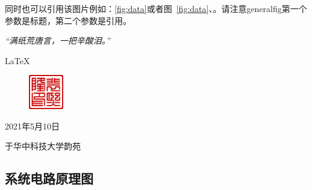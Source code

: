 \documentclass[supercite]{HustGraduPaper}
\begin{document}
同时也可以引用该图片例如：\autoref{fig:data}或者图~\ref{fig:data}、。请注意generalfig第一个参数是标题，第二个参数是引用。

\newpage



\begin{thankpage}
	
	\begin{center}
		{\itshape “满纸荒唐言，一把辛酸泪。”}
	\end{center}
	
	\LaTeX



	\begin{figure}[htb]
		\flushright
		\includegraphics[width=15mm]{Figures/Seal-pxl.pdf}
	\end{figure}

	\begin{flushright}
		2021年5月10日

		于华中科技大学韵苑
	\end{flushright}
	
\end{thankpage}



\begin{appendices}
	\section{系统电路原理图}
\end{appendices}
\end{document}
